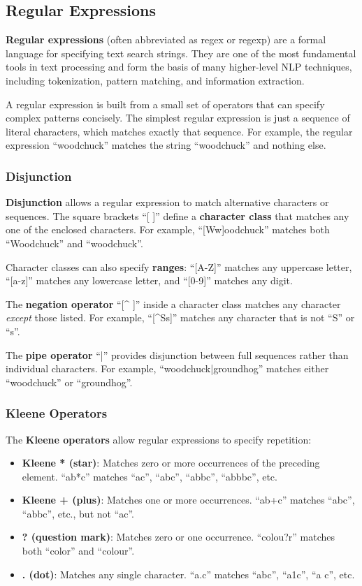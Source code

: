 \documentclass[11pt,a4paper]{article}
\begin{document}
\subsection{Regular Expressions}

\textbf{Regular expressions} (often abbreviated as regex or regexp) are a formal language for specifying text search strings. They are one of the most fundamental tools in text processing and form the basis of many higher-level NLP techniques, including tokenization, pattern matching, and information extraction.

A regular expression is built from a small set of operators that can specify complex patterns concisely. The simplest regular expression is just a sequence of literal characters, which matches exactly that sequence. For example, the regular expression ``woodchuck'' matches the string ``woodchuck'' and nothing else.

\subsubsection{Disjunction}

\textbf{Disjunction} allows a regular expression to match alternative characters or sequences. The square brackets ``[ ]'' define a \textbf{character class} that matches any one of the enclosed characters. For example, ``[Ww]oodchuck'' matches both ``Woodchuck'' and ``woodchuck''.

Character classes can also specify \textbf{ranges}: ``[A-Z]'' matches any uppercase letter, ``[a-z]'' matches any lowercase letter, and ``[0-9]'' matches any digit.

The \textbf{negation operator} ``[\^{} ]'' inside a character class matches any character \textit{except} those listed. For example, ``[\^{}Ss]'' matches any character that is not ``S'' or ``s''.

The \textbf{pipe operator} ``|'' provides disjunction between full sequences rather than individual characters. For example, ``woodchuck|groundhog'' matches either ``woodchuck'' or ``groundhog''.

\subsubsection{Kleene Operators}

The \textbf{Kleene operators} allow regular expressions to specify repetition:
\begin{itemize}
    \item \textbf{Kleene * (star)}: Matches zero or more occurrences of the preceding element. ``ab*c'' matches ``ac'', ``abc'', ``abbc'', ``abbbc'', etc.
    \item \textbf{Kleene + (plus)}: Matches one or more occurrences. ``ab+c'' matches ``abc'', ``abbc'', etc., but not ``ac''.
    \item \textbf{? (question mark)}: Matches zero or one occurrence. ``colou?r'' matches both ``color'' and ``colour''.
    \item \textbf{. (dot)}: Matches any single character. ``a.c'' matches ``abc'', ``a1c'', ``a c'', etc.
\end{itemize}
\end{document}
